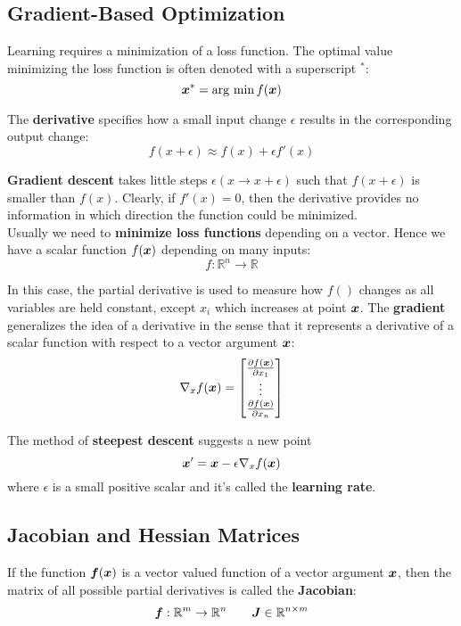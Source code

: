\begin{multicols}{2}
	\subsection{Gradient-Based Optimization}
	Learning requires a minimization of a loss function. The optimal value minimizing the loss function is often denoted with a superscript $^\ast$:
	\[ \bol{x}^\ast = \arg\,\min f(\bol{x}) \]
	
	The \textbf{derivative} specifies how a small input change $\epsilon$ results in the corresponding output change:
	\[ f(x+\epsilon) \approx f(x) + \epsilon f'(x) \]
	
	\textbf{Gradient descent} takes little steps $\epsilon (x\rightarrow x+\epsilon)$ such that $f(x+\epsilon)$ is smaller than $f(x)$.
	Clearly, if $f'(x)=0$, then the derivative provides no information in which direction the function could be minimized.\\
	
	Usually we need to \textbf{minimize loss functions} depending on a vector.
	Hence we have a scalar function $f(\bol{x})$ depending on many inputs:
	\[ f:\mathbb{R}^n\rightarrow \mathbb{R} \]
	
	In this case, the partial derivative is used to measure how $f()$ changes as all variables are held constant, except $x_i$ which increases at point $\bol{x}$. 
	The \textbf{gradient} generalizes the idea of a derivative in the sense that it represents a derivative of a scalar function with respect to a vector argument $\bol{x}$:
	\[ \nabla_x f(\bol{x}) =
	\begin{bmatrix} \frac{\partial f(\bol{x})}{\partial x_1}\\ \vdots \\ \frac{\partial f(\bol{x})}{\partial x_n} \end{bmatrix}  \]
	
	The method of \textbf{steepest descent} suggests a new point
	\[ \bol{x}' = \bol{x}-\epsilon\nabla_xf(\bol{x}) \]
	where $\epsilon$ is a small positive scalar and it's called the \textbf{learning rate}.
	
	\subsection{Jacobian and Hessian Matrices}
	If the function $\bol{f}(\bol{x})$ is a vector valued function of a vector argument $\bol{x}$, then the matrix of all possible partial derivatives is called the \textbf{Jacobian}:
	\[ \bol{f}:\mathbb{R}^m\rightarrow \mathbb{R}^n \qquad \bol{J}\in \mathbb{R}^{n\times m} \]
	

\end{multicols}
